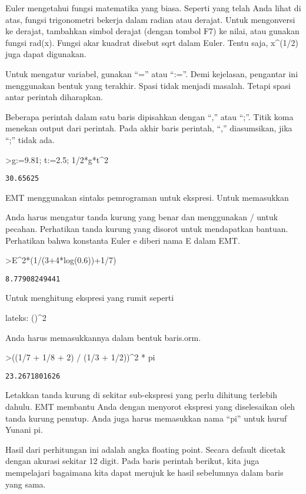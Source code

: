 \documentclass[
]{book}
\begin{document}
Euler mengetahui fungsi matematika yang biasa. Seperti yang telah Anda lihat di atas, fungsi trigonometri bekerja dalam radian atau derajat. Untuk mengonversi ke derajat, tambahkan simbol derajat (dengan tombol F7) ke nilai, atau gunakan fungsi rad(x). Fungsi akar kuadrat disebut sqrt dalam Euler. Tentu saja, x\^{}(1/2) juga dapat digunakan.

Untuk mengatur variabel, gunakan ``='' atau ``:=''. Demi kejelasan, pengantar ini menggunakan bentuk yang terakhir. Spasi tidak menjadi masalah. Tetapi spasi antar perintah diharapkan.

Beberapa perintah dalam satu baris dipisahkan dengan ``,'' atau ``;''. Titik koma menekan output dari perintah. Pada akhir baris perintah, ``,'' diasumsikan, jika ``;'' tidak ada.

\textgreater g:=9.81; t:=2.5; 1/2*g*t\^{}2

\begin{verbatim}
30.65625
\end{verbatim}

EMT menggunakan sintaks pemrograman untuk ekspresi. Untuk memasukkan

Anda harus mengatur tanda kurung yang benar dan menggunakan / untuk pecahan. Perhatikan tanda kurung yang disorot untuk mendapatkan bantuan. Perhatikan bahwa konstanta Euler e diberi nama E dalam EMT.

\textgreater E\^{}2*(1/(3+4*log(0.6))+1/7)

\begin{verbatim}
8.77908249441
\end{verbatim}

Untuk menghitung ekspresi yang rumit seperti

lateks: \left(\right)\^{}2 \pi

Anda harus memasukkannya dalam bentuk baris.orm.

\textgreater((1/7 + 1/8 + 2) / (1/3 + 1/2))\^{}2 * pi

\begin{verbatim}
23.2671801626
\end{verbatim}

Letakkan tanda kurung di sekitar sub-ekspresi yang perlu dihitung terlebih dahulu. EMT membantu Anda dengan menyorot ekspresi yang diselesaikan oleh tanda kurung penutup. Anda juga harus memasukkan nama ``pi'' untuk huruf Yunani pi.

Hasil dari perhitungan ini adalah angka floating point. Secara default dicetak dengan akurasi sekitar 12 digit. Pada baris perintah berikut, kita juga mempelajari bagaimana kita dapat merujuk ke hasil sebelumnya dalam baris yang sama.
\end{document}
